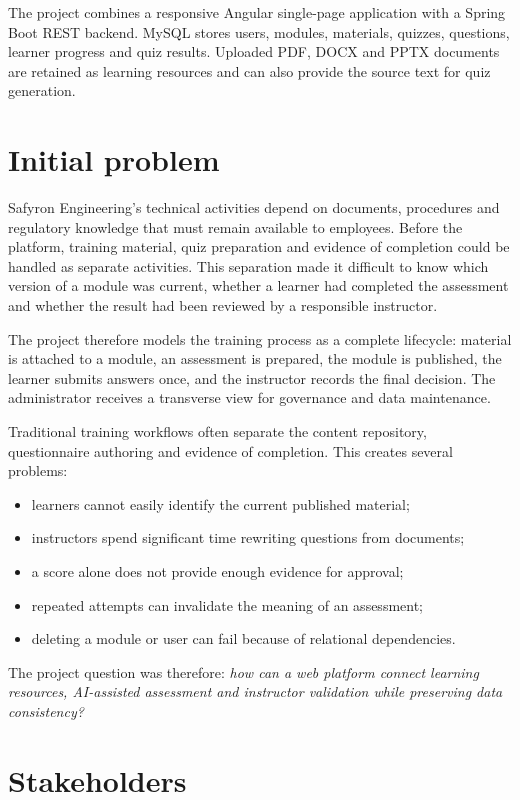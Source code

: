 The project combines a responsive Angular single-page application with a
Spring Boot REST backend. MySQL stores users, modules, materials, quizzes,
questions, learner progress and quiz results. Uploaded PDF, DOCX and PPTX
documents are retained as learning resources and can also provide the source
text for quiz generation.

\section{Initial problem}
Safyron Engineering's technical activities depend on documents, procedures and
regulatory knowledge that must remain available to employees. Before the
platform, training material, quiz preparation and evidence of completion could
be handled as separate activities. This separation made it difficult to know
which version of a module was current, whether a learner had completed the
assessment and whether the result had been reviewed by a responsible
instructor.

The project therefore models the training process as a complete lifecycle:
material is attached to a module, an assessment is prepared, the module is
published, the learner submits answers once, and the instructor records the
final decision. The administrator receives a transverse view for governance
and data maintenance.

Traditional training workflows often separate the content repository,
questionnaire authoring and evidence of completion. This creates several
problems:
\begin{itemize}
\item learners cannot easily identify the current published material;
\item instructors spend significant time rewriting questions from documents;
\item a score alone does not provide enough evidence for approval;
\item repeated attempts can invalidate the meaning of an assessment;
\item deleting a module or user can fail because of relational dependencies.
\end{itemize}

The project question was therefore: \emph{how can a web platform connect
learning resources, AI-assisted assessment and instructor validation while
preserving data consistency?}

\section{Stakeholders}
